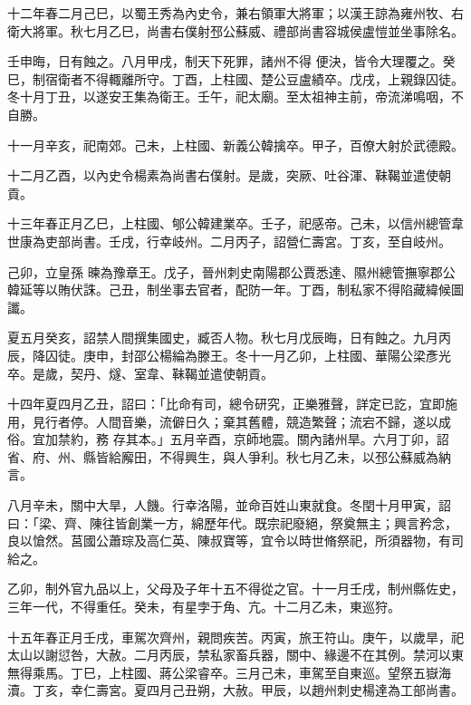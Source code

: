 \begin{pinyinscope}
 十二年春二月己巳，以蜀王秀為內史令，兼右領軍大將軍；以漢王諒為雍州牧、右衛大將軍。秋七月乙巳，尚書右僕射邳公蘇威、禮部尚書容城侯盧愷並坐事除名。



 壬申晦，日有蝕之。八月甲戌，制天下死罪，諸州不得
 便決，皆令大理覆之。癸巳，制宿衛者不得輙離所守。丁酉，上柱國、楚公豆盧績卒。戊戌，上親錄囚徒。冬十月丁丑，以遂安王集為衛王。壬午，祀太廟。至太祖神主前，帝流涕鳴咽，不自勝。



 十一月辛亥，祀南郊。己未，上柱國、新義公韓擒卒。甲子，百僚大射於武德殿。



 十二月乙酉，以內史令楊素為尚書右僕射。是歲，突厥、吐谷渾、靺鞨並遣使朝貢。



 十三年春正月乙巳，上柱國、郇公韓建業卒。壬子，祀感帝。己未，以信州總管韋世康為吏部尚書。壬戌，行幸岐州。二月丙子，詔營仁壽宮。丁亥，至自岐州。



 己卯，立皇孫
 暕為豫章王。戊子，晉州刺史南陽郡公賈悉達、隰州總管撫寧郡公韓延等以賄伏誅。己丑，制坐事去官者，配防一年。丁酉，制私家不得陷藏緯候圖讖。



 夏五月癸亥，詔禁人間撰集國史，臧否人物。秋七月戊辰晦，日有蝕之。九月丙辰，降囚徒。庚申，封邵公楊綸為滕王。冬十一月乙卯，上柱國、華陽公梁彥光卒。是歲，契丹、燧、室韋、靺鞨並遣使朝貢。



 十四年夏四月乙丑，詔曰：「比命有司，總令研究，正樂雅聲，詳定已訖，宜即施用，見行者停。人間音樂，流僻日久；棄其舊體，競造繁聲；流宕不歸，遂以成俗。宜加禁約，務
 存其本。」五月辛酉，京師地震。關內諸州旱。六月丁卯，詔省、府、州、縣皆給廨田，不得興生，與人爭利。秋七月乙未，以邳公蘇威為納言。



 八月辛未，關中大旱，人饑。行幸洛陽，並命百姓山東就食。冬閏十月甲寅，詔曰：「梁、齊、陳往皆創業一方，綿歷年代。既宗祀廢絕，祭奠無主；興言矜念，良以愴然。莒國公蕭琮及高仁英、陳叔寶等，宜令以時世脩祭祀，所須器物，有司給之。



 乙卯，制外官九品以上，父母及子年十五不得從之官。十一月壬戌，制州縣佐史，三年一代，不得重任。癸未，有星孛于角、亢。十二月乙未，東巡狩。



 十五年春正月壬戌，車駕次齊州，親問疾苦。丙寅，旅王符山。庚午，以歲旱，祀太山以謝愆咎，大赦。二月丙辰，禁私家畜兵器，關中、緣邊不在其例。禁河以東無得乘馬。丁巳，上柱國、蔣公梁睿卒。三月己未，車駕至自東巡。望祭五嶽海瀆。丁亥，幸仁壽宮。夏四月己丑朔，大赦。甲辰，以趙州刺史楊達為工部尚書。




\end{pinyinscope}
